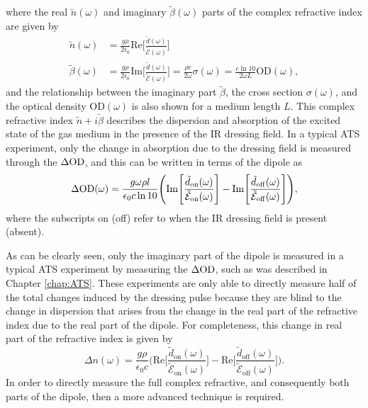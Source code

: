 where the real $\tilde{n}(\omega)$ and imaginary $\tilde{\beta}(\omega)$ parts of the complex refractive index are given by
\begin{equation}
	\begin{aligned}
		\tilde{n}(\omega) &= \frac{g \rho}{2 \epsilon_0} \mathrm{Re}\Bigg[ \frac{\tilde{d}(\omega)}{\tilde{\mathcal{E}}(\omega)} \Bigg]\\
		\tilde{\beta}(\omega) &= \frac{g \rho}{2\epsilon_0} \mathrm{Im}\Bigg[ \frac{\tilde{d}(\omega)}{\tilde{\mathcal{E}}(\omega)} \Bigg] = \frac{\rho c}{2\omega}\sigma(\omega) = \frac{c \ln 10}{2\omega L} \mathrm{OD}(\omega),
	\end{aligned}
\end{equation}
and the relationship between the imaginary part $\tilde{\beta}$, the cross section $\sigma(\omega)$, and the optical density $\mathrm{OD}(\omega)$ is also shown for a medium length $L$.  This complex refractive index $\tilde{n} + i\tilde{\beta}$ describes the dispersion and absorption of the excited state of the gas medium in the presence of the IR dressing field.  In a typical ATS experiment, only the change in absorption due to the dressing field is measured through the $\Delta\mathrm{OD}$, and this can be written in terms of the dipole as 
\begin{equation}
	\label{eqn:dod_im_dipole}
	\Delta\mathrm{OD}(\omega) = \frac{g \omega \rho l}{\epsilon_0 c \ln 10}\Bigg( \mathrm{Im}\Bigg[\frac{\tilde{d}_{\mathrm{on}}(\omega)}{\tilde{\mathcal{E}}_{\mathrm{on}}(\omega)}\Bigg] - \mathrm{Im}\Bigg[\frac{\tilde{d}_{\mathrm{off}}(\omega)}{\tilde{\mathcal{E}}_{\mathrm{off}}(\omega)}\Bigg] \Bigg),
\end{equation}
where the subscripts on (off) refer to when the IR dressing field is present (absent).

As can be clearly seen, only the imaginary part of the dipole is measured in a typical ATS experiment by measuring the $\Delta\mathrm{OD}$, such as was described in Chapter \ref{chap:ATS}.  These experiments are only able to directly measure half of the total changes induced by the dressing pulse because they are blind to the change in dispersion that arises from the change in the real part of the refractive index due to the real part of the dipole.  For completeness, this change in real part of the refractive index is given by 
\begin{equation}
	\label{eqn:dn_re_dipole}
	\Delta n(\omega) = \frac{g\rho}{\epsilon_0 c} \Bigg( \mathrm{Re}\Bigg[\frac{\tilde{d}_{\mathrm{on}}(\omega)}{\tilde{\mathcal{E}}_{\mathrm{on}}(\omega)}\Bigg] - \mathrm{Re}\Bigg[\frac{\tilde{d}_{\mathrm{off}}(\omega)}{\tilde{\mathcal{E}}_{\mathrm{off}}(\omega)}\Bigg] 
	\Bigg).
\end{equation}
In order to directly measure the full complex refractive, and consequently both parts of the dipole, then a more advanced technique is required. 



